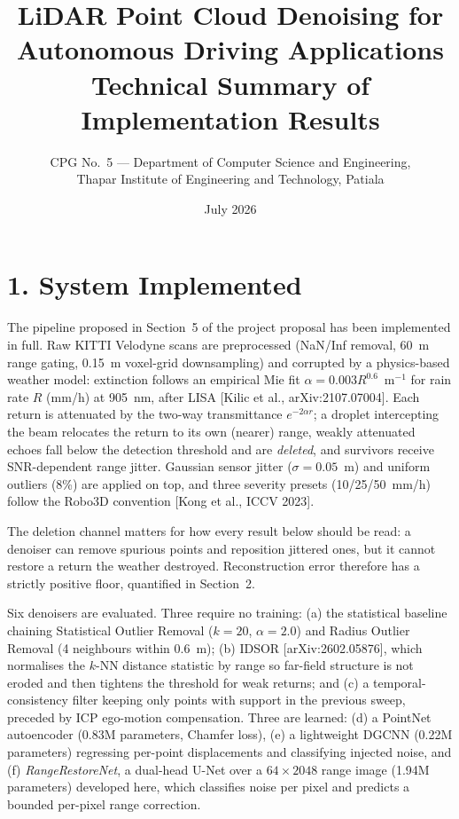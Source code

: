 \documentclass[12pt,a4paper]{article}
\title{\vspace{-1.5cm}\Large\bfseries LiDAR Point Cloud Denoising for Autonomous
Driving Applications\\[4pt]\large Technical Summary of Implementation Results}
\author{CPG No.~5 --- Department of Computer Science and Engineering,\\
Thapar Institute of Engineering and Technology, Patiala}
\date{July 2026}
\begin{document}
\maketitle
\vspace{-0.8cm}

\section*{1. System Implemented}

The pipeline proposed in Section~5 of the project proposal has been
implemented in full. Raw KITTI Velodyne scans are preprocessed (NaN/Inf
removal, 60~m range gating, 0.15~m voxel-grid downsampling) and corrupted by
a physics-based weather model: extinction follows an empirical Mie fit
$\alpha = 0.003R^{0.6}$~m$^{-1}$ for rain rate $R$ (mm/h) at 905~nm, after
LISA [Kilic et al., arXiv:2107.07004]. Each return is attenuated by the
two-way transmittance $e^{-2\alpha r}$; a droplet intercepting the beam
relocates the return to its own (nearer) range, weakly attenuated echoes
fall below the detection threshold and are \emph{deleted}, and survivors
receive SNR-dependent range jitter. Gaussian sensor jitter
($\sigma=0.05$~m) and uniform outliers (8\%) are applied on top, and three
severity presets (10/25/50~mm/h) follow the Robo3D convention
[Kong et al., ICCV 2023].

The deletion channel matters for how every result below should be read: a
denoiser can remove spurious points and reposition jittered ones, but it
cannot restore a return the weather destroyed. Reconstruction error
therefore has a strictly positive floor, quantified in Section~2.

Six denoisers are evaluated. Three require no training: (a) the statistical
baseline chaining Statistical Outlier Removal ($k=20$, $\alpha=2.0$) and
Radius Outlier Removal (4 neighbours within 0.6~m); (b) IDSOR
[arXiv:2602.05876], which normalises the $k$-NN distance statistic by range
so far-field structure is not eroded and then tightens the threshold for
weak returns; and (c) a temporal-consistency filter keeping only points with
support in the previous sweep, preceded by ICP ego-motion compensation.
Three are learned: (d) a PointNet autoencoder (0.83M parameters, Chamfer
loss), (e) a lightweight DGCNN (0.22M parameters) regressing per-point
displacements and classifying injected noise, and (f) \emph{RangeRestoreNet},
a dual-head U-Net over a $64\times2048$ range image (1.94M parameters)
developed here, which classifies noise per pixel and predicts a bounded
per-pixel range correction.
\end{document}
